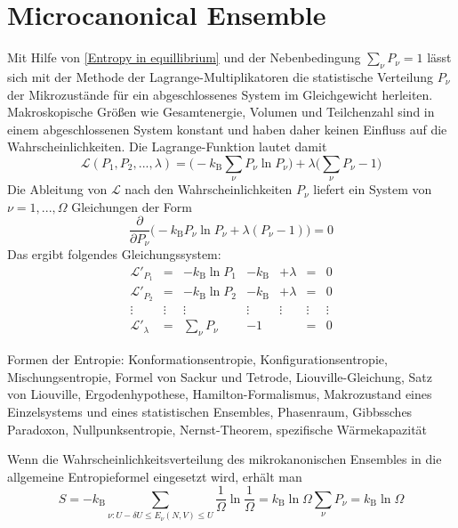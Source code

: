 \documentclass[9pt]{report}
\begin{document}
\section{Microcanonical Ensemble}

Mit Hilfe von \eqref{Entropy in equillibrium} und der Nebenbedingung $\sum_{\nu}P_{\nu}=1$ lässt sich mit der Methode der Lagrange-Multiplikatoren die statistische Verteilung $P_{\nu}$ der Mikrozustände für ein abgeschlossenes System im Gleichgewicht herleiten. Makroskopische Größen wie Gesamtenergie, Volumen und Teilchenzahl sind in einem abgeschlossenen System konstant und haben daher keinen Einfluss auf die Wahrscheinlichkeiten. Die Lagrange-Funktion lautet damit
\begin{equation}
\mathcal{L}(P_1,P_2,...,\lambda)=\bigg(-k_{\mathrm{B}}\sum_{\nu}P_{\nu}\ln P_{\nu}\bigg)+\lambda\bigg(\sum_{\nu}P_{\nu}-1\bigg)
\end{equation}
Die Ableitung von $\mathcal{L}$ nach den Wahrscheinlichkeiten $P_{\nu}$ liefert ein System von $\nu=1,...,\Omega$ Gleichungen der Form
\begin{equation}
\frac{\partial}{\partial P_{\nu}}\bigg(-k_{\mathrm{B}}P_{\nu}\ln P_{\nu}+\lambda(P_{\nu}-1)\bigg)=0
\end{equation}
Das ergibt folgendes Gleichungssystem:
\begin{equation}
\begin{array}{|ccccccc|}
\mathcal{L}'_{P_1} & = &  -k_{\mathrm{B}}\ln P_1  & -k_{\mathrm{B}} &  +\lambda & = & 0\\
\mathcal{L}'_{P_2} & = &  -k_{\mathrm{B}}\ln P_2  & -k_{\mathrm{B}} &  +\lambda & = & 0\\
\vdots & \vdots & \vdots  &  \vdots  &  \vdots  & \vdots  & \vdots \\
\mathcal{L}'_{\lambda} &  = & \displaystyle\sum_{\nu}P_{\nu} & -1 &  & =  & 0
\end{array}
\end{equation}

Formen der Entropie: Konformationsentropie, Konfigurationsentropie, Mischungsentropie, Formel von Sackur und Tetrode, Liouville-Gleichung, Satz von Liouville, Ergodenhypothese, Hamilton-Formalismus, Makrozustand eines Einzelsystems und eines statistischen Ensembles, Phasenraum, Gibbssches Paradoxon, Nullpunksentropie, Nernst-Theorem, spezifische Wärmekapazität

Wenn die Wahrscheinlichkeitsverteilung des mikrokanonischen Ensembles in die allgemeine Entropieformel eingesetzt wird, erhält man
\begin{equation}
S = -k_{\mathrm{B}}\sum_{\nu:U-\delta U\leq E_{\nu}(N,V)\leq U}\frac{1}{\Omega}\ln\frac{1}{\Omega}=k_{\mathrm{B}}\ln\Omega\sum_{\nu}P_{\nu}=k_{\mathrm{B}}\ln\Omega
\end{equation}
\end{document}
